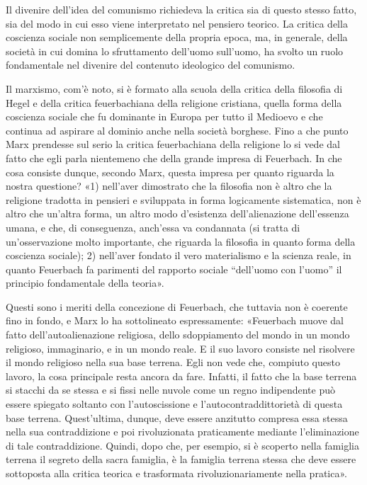 \documentclass[../main]{subfiles}
\begin{document}
Il divenire dell'idea del comunismo richiedeva la critica sia di questo stesso fatto, sia del modo in cui esso viene interpretato nel pensiero teorico. La critica della coscienza sociale non semplicemente della propria epoca, ma, in generale, della società in cui domina lo sfruttamento dell'uomo sull'uomo, ha svolto un ruolo fondamentale nel divenire del contenuto ideologico del comunismo.

Il marxismo, com'è noto, si è formato alla scuola della critica della filosofia di Hegel e della critica feuerbachiana della religione cristiana, quella forma della coscienza sociale che fu dominante in Europa per tutto il Medioevo e che continua ad aspirare al dominio anche nella società borghese. Fino a che punto Marx prendesse sul serio la critica feuerbachiana della religione lo si vede dal fatto che egli parla nientemeno che della grande impresa di Feuerbach. In che cosa consiste dunque, secondo Marx, questa impresa per quanto riguarda la nostra questione? «1) nell'aver dimostrato che la filosofia non è altro che la religione tradotta in pensieri e sviluppata in forma logicamente sistematica, non è altro che un'altra forma, un altro modo d'esistenza dell'alienazione dell'essenza umana, e che, di conseguenza, anch'essa va condannata (si tratta di un'osservazione molto importante, che riguarda la filosofia in quanto forma della coscienza sociale); 2) nell'aver fondato il vero materialismo e la scienza reale, in quanto Feuerbach fa parimenti del rapporto sociale “dell'uomo con l'uomo” il principio fondamentale della teoria».

Questi sono i meriti della concezione di Feuerbach, che tuttavia non è coerente fino in fondo, e Marx lo ha sottolineato espressamente: «Feuerbach muove dal fatto dell'autoalienazione religiosa, dello sdoppiamento del mondo in un mondo religioso, immaginario, e in un mondo reale. E il suo lavoro consiste nel risolvere il mondo religioso nella sua base terrena. Egli non vede che, compiuto questo lavoro, la cosa principale resta ancora da fare. Infatti, il fatto che la base terrena si stacchi da se stessa e si fissi nelle nuvole come un regno indipendente può essere spiegato soltanto con l'autoscissione e l'autocontraddittorietà di questa base terrena. Quest'ultima, dunque, deve essere anzitutto compresa essa stessa nella sua contraddizione e poi rivoluzionata praticamente mediante l'eliminazione di tale contraddizione. Quindi, dopo che, per esempio, si è scoperto nella famiglia terrena il segreto della sacra famiglia, è la famiglia terrena stessa che deve essere sottoposta alla critica teorica e trasformata rivoluzionariamente nella pratica».
\end{document}
